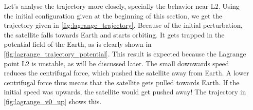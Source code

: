 Let's analyse the trajectory more closely, specially the behavior near L2. Using the initial configuration given at the beginning of this section, we get the trajectory given in \autoref{fig:lagrange_trajectory}. Because of the initial perturbation, the satellite falls towards Earth and starts orbiting. It gets trapped in the potential field of the Earth, as is clearly shown in \autoref{fig:lagrange_trajectory_potential}. This result is expected because the Lagrange point L2 is unstable, as will be discussed later. The small downwards speed reduces the centrifugal force, which pushed the satellite away from Earth. A lower centrifugal force thus means that the satellite gets pulled towards Earth. If the initial speed was upwards, the satellite would get pushed away! The trajectory in \autoref{fig:lagrange_v0_up} shows this.

